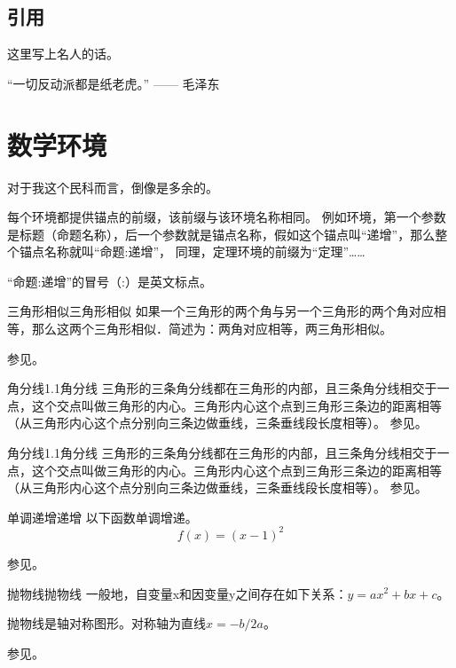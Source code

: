 \documentclass[12pt,A4paper,oneside]{ctexbook}
\begin{document}
\subsection{引用}
\begin{引用}
    这里写上名人的话。

    “一切反动派都是纸老虎。” —— 毛泽东
\end{引用}

\section{数学环境}
对于我这个民科而言，倒像是多余的。

每个环境都提供锚点的前缀，该前缀与该环境名称相同。
例如环境，第一个参数是标题（命题名称），后一个参数就是锚点名称，假如这个锚点叫“递增”，那么整个锚点名称就叫“命题:递增”，
同理，定理环境的前缀为“定理”……

\begin{注意}
    “命题:递增”的冒号（:）是英文标点。
\end{注意}

\begin{定理}{三角形相似}{三角形相似}
    如果一个三角形的两个角与另一个三角形的两个角对应相等，那么这两个三角形相似．简述为：两角对应相等，两三角形相似。

    参见。
\end{定理}

\begin{结论}{角分线1.1}{角分线}
	三角形的三条角分线都在三角形的内部，且三条角分线相交于一点，这个交点叫做三角形的内心。三角形内心这个点到三角形三条边的距离相等（从三角形内心这个点分别向三条边做垂线，三条垂线段长度相等）。
	参见。
\end{结论}

\begin{结论}{角分线1.1}{角分线}
    三角形的三条角分线都在三角形的内部，且三条角分线相交于一点，这个交点叫做三角形的内心。三角形内心这个点到三角形三条边的距离相等（从三角形内心这个点分别向三条边做垂线，三条垂线段长度相等）。
    参见。
\end{结论}

\begin{命题}{单调递增}{递增}
以下函数单调增递。
\[
    f(x) = (x - 1) ^ 2
\]

参见。
\end{命题}

\begin{定义}{抛物线}{抛物线}
    一般地，自变量x和因变量y之间存在如下关系：$y=ax^2+bx+c$。

    抛物线是轴对称图形。对称轴为直线$x=-b/2a$。

    参见。
\end{定义}
\end{document}
